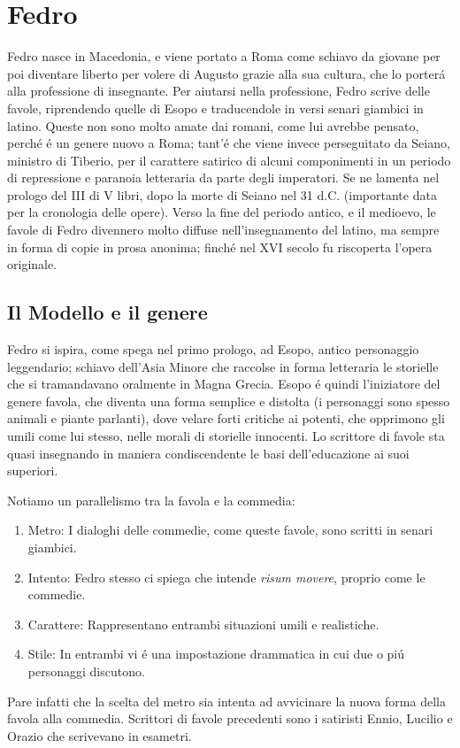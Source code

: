 \documentclass{article}
\begin{document}
\section{Fedro}
Fedro nasce in Macedonia, e viene portato a Roma come schiavo da giovane per poi diventare liberto per volere di Augusto grazie alla sua cultura, che lo porterá alla professione di insegnante. Per aiutarsi nella professione, Fedro scrive delle favole, riprendendo quelle di Esopo e traducendole in versi senari giambici in latino. Queste non sono molto amate dai romani, come lui avrebbe pensato, perché é un genere nuovo a Roma; tant'é che viene invece perseguitato da Seiano, ministro di Tiberio, per il carattere satirico di alcuni componimenti in un periodo di repressione e paranoia letteraria da parte degli imperatori. Se ne lamenta nel prologo del III di V libri, dopo la morte di Seiano nel 31 d.C. (importante data per la cronologia delle opere). Verso la fine del periodo antico, e il medioevo, le favole di Fedro divennero molto diffuse nell'insegnamento del latino, ma sempre in forma di copie in prosa anonima; finché nel XVI secolo fu riscoperta l'opera originale.
\subsection{Il Modello e il genere}
Fedro si ispira, come spega nel primo prologo, ad Esopo, antico personaggio leggendario; schiavo dell'Asia Minore che raccolse in forma letteraria le storielle che si tramandavano oralmente in Magna Grecia. Esopo é quindi l'iniziatore del genere favola, che diventa una forma semplice e distolta (i personaggi sono spesso animali e piante parlanti), dove velare forti critiche ai potenti, che opprimono gli umili come lui stesso, nelle morali di storielle innocenti. Lo scrittore di favole sta quasi insegnando in maniera condiscendente le basi dell'educazione ai suoi superiori. 

Notiamo un parallelismo tra la favola e la commedia:
\begin{enumerate}
    \item Metro: I dialoghi delle commedie, come queste favole, sono scritti in senari giambici.
    \item Intento: Fedro stesso ci spiega che intende \emph{risum movere}, proprio come le commedie.
    \item Carattere: Rappresentano entrambi situazioni umili e realistiche.
    \item Stile: In entrambi vi é una impostazione drammatica in cui due o piú personaggi discutono.
\end{enumerate}
Pare infatti che la scelta del metro sia intenta ad avvicinare la nuova forma della favola alla commedia. Scrittori di favole precedenti sono i satiristi Ennio, Lucilio e Orazio che scrivevano in esametri.
\end{document}
